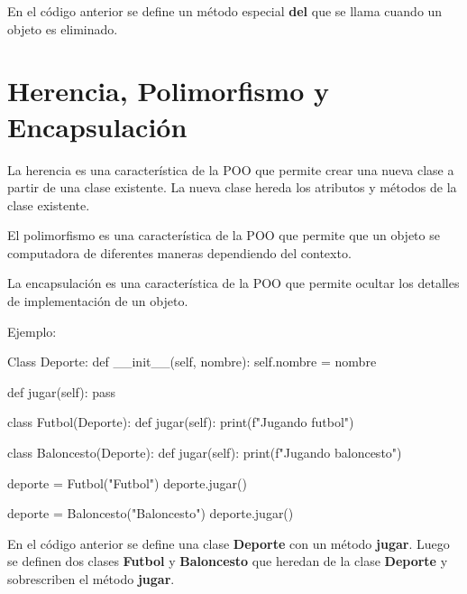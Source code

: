 \documentclass[
  a4paper,
  DIV=11,
  numbers=noendperiod,
  onepage,
  openany]{scrreprt}
\newenvironment{Shaded}{\begin{snugshade}}{\end{snugshade}}
\newcommand{\BuiltInTok}[1]{\textcolor[rgb]{0.00,0.23,0.31}{#1}}
\newcommand{\ControlFlowTok}[1]{\textcolor[rgb]{0.00,0.23,0.31}{#1}}
\newcommand{\FunctionTok}[1]{\textcolor[rgb]{0.28,0.35,0.67}{#1}}
\newcommand{\KeywordTok}[1]{\textcolor[rgb]{0.00,0.23,0.31}{#1}}
\newcommand{\NormalTok}[1]{\textcolor[rgb]{0.00,0.23,0.31}{#1}}
\newcommand{\OperatorTok}[1]{\textcolor[rgb]{0.37,0.37,0.37}{#1}}
\newcommand{\SpecialStringTok}[1]{\textcolor[rgb]{0.13,0.47,0.30}{#1}}
\newcommand{\StringTok}[1]{\textcolor[rgb]{0.13,0.47,0.30}{#1}}
\newcommand{\VariableTok}[1]{\textcolor[rgb]{0.07,0.07,0.07}{#1}}
\begin{document}
En el código anterior se define un método especial \textbf{\textbf{del}}
que se llama cuando un objeto es eliminado.

\section{Herencia, Polimorfismo y
Encapsulación}\label{herencia-polimorfismo-y-encapsulaciuxf3n}

La herencia es una característica de la POO que permite crear una nueva
clase a partir de una clase existente. La nueva clase hereda los
atributos y métodos de la clase existente.

El polimorfismo es una característica de la POO que permite que un
objeto se computadora de diferentes maneras dependiendo del contexto.

La encapsulación es una característica de la POO que permite ocultar los
detalles de implementación de un objeto.

Ejemplo:

\begin{Shaded}
\begin{Highlighting}[]
\NormalTok{Class Deporte:}
    \KeywordTok{def} \FunctionTok{\_\_init\_\_}\NormalTok{(}\VariableTok{self}\NormalTok{, nombre):}
        \VariableTok{self}\NormalTok{.nombre }\OperatorTok{=}\NormalTok{ nombre}

    \KeywordTok{def}\NormalTok{ jugar(}\VariableTok{self}\NormalTok{):}
        \ControlFlowTok{pass}

\KeywordTok{class}\NormalTok{ Futbol(Deporte):}
  \KeywordTok{def}\NormalTok{ jugar(}\VariableTok{self}\NormalTok{):}
      \BuiltInTok{print}\NormalTok{(}\SpecialStringTok{f"Jugando futbol"}\NormalTok{)}

\KeywordTok{class}\NormalTok{ Baloncesto(Deporte):}
  \KeywordTok{def}\NormalTok{ jugar(}\VariableTok{self}\NormalTok{):}
      \BuiltInTok{print}\NormalTok{(}\SpecialStringTok{f"Jugando baloncesto"}\NormalTok{)}

\NormalTok{deporte }\OperatorTok{=}\NormalTok{ Futbol(}\StringTok{"Futbol"}\NormalTok{)}
\NormalTok{deporte.jugar()}

\NormalTok{deporte }\OperatorTok{=}\NormalTok{ Baloncesto(}\StringTok{"Baloncesto"}\NormalTok{)}
\NormalTok{deporte.jugar()}
\end{Highlighting}
\end{Shaded}

En el código anterior se define una clase \textbf{Deporte} con un método
\textbf{jugar}. Luego se definen dos clases \textbf{Futbol} y
\textbf{Baloncesto} que heredan de la clase \textbf{Deporte} y
sobrescriben el método \textbf{jugar}.
\end{document}
